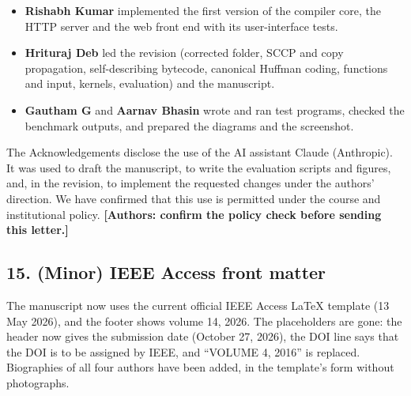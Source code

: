 \documentclass[11pt,a4paper]{article}
\begin{document}
\begin{itemize}
\item \textbf{Rishabh Kumar} implemented the first version of the compiler core, the HTTP server and the web front end with its user-interface tests.
\item \textbf{Hrituraj Deb} led the revision (corrected folder, SCCP and copy propagation, self-describing bytecode, canonical Huffman coding, functions and input, kernels, evaluation) and the manuscript.
\item \textbf{Gautham G} and \textbf{Aarnav Bhasin} wrote and ran test programs, checked the benchmark outputs, and prepared the diagrams and the screenshot.
\end{itemize}
The Acknowledgements disclose the use of the AI assistant Claude (Anthropic). It was used to draft the manuscript, to write the evaluation scripts and figures, and, in the revision, to implement the requested changes under the authors' direction. We have confirmed that this use is permitted under the course and institutional policy. \textbf{[Authors: confirm the policy check before sending this letter.]}

\subsection*{15. (Minor) IEEE Access front matter}
The manuscript now uses the current official IEEE Access LaTeX template (13 May 2026), and the footer shows volume 14, 2026. The placeholders are gone: the header now gives the submission date (October 27, 2026), the DOI line says that the DOI is to be assigned by IEEE, and ``VOLUME 4, 2016'' is replaced. Biographies of all four authors have been added, in the template's form without photographs.
\end{document}

